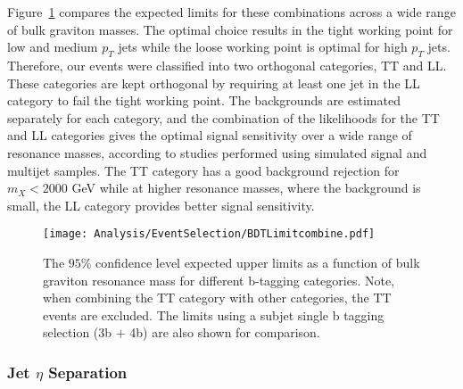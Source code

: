 \noindent
Figure~\ref{fig:DoubleBoptimization} compares the expected limits for these combinations across a wide range of bulk graviton masses. The optimal choice results in the tight working point for low and medium $p_{T}$ jets while the loose working point is optimal for high $p_{T}$ jets. Therefore, our events were classified into two orthogonal categories, TT and LL. These categories are kept orthogonal by requiring at least one jet in the LL category to fail the tight working point. The backgrounds are estimated separately for each category, and the combination of the likelihoods for the TT and LL categories gives the optimal signal sensitivity over a wide range of resonance masses, according to studies performed using simulated signal and multijet samples. The TT category has a good background rejection for $m_{X} < 2000$ GeV while at higher resonance masses, where the background is small, the LL category provides better signal sensitivity.





\begin{figure}[h!]
\begin{center}
\texttt{[image: Analysis/EventSelection/BDTLimitcombine.pdf]}
\end{center}
\caption{The $95\%$ confidence level expected upper limits as a function of bulk graviton resonance mass for different b-tagging categories. Note, when combining the TT category with other categories, the TT events are excluded. The limits using a subjet single b tagging selection (3b $+$ 4b) are also shown for comparison. }
\label{fig:DoubleBoptimization}
\end{figure}

\subsubsection{Jet $\eta$ Separation}

